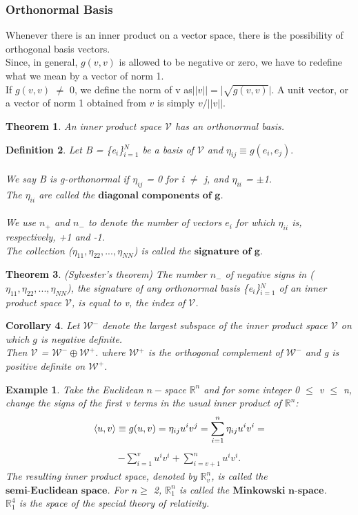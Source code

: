 \documentclass[12pt,a4paper]{article}
\newtheorem{thm}{Theorem}
\newtheorem{cor}[thm]{Corollary}
\newtheorem{defn}[thm]{Definition}
\newtheorem{exmp}{Example}[section]
\begin{document}
\subsubsection{Orthonormal Basis}
Whenever there is an inner product on a vector space, there is the possibility
of orthogonal basis vectors. \\Since, in general, $g(v, v)$ is allowed to be negative or zero, we have to redefine what we mean by a vector of norm 1. \\If
$g(v, v)$ $\ne$ 0, we define the norm of v as$ ||v|| = $|$\sqrt{g(v,v)}|$. A unit vector, or
a vector of norm 1 obtained from $v$ is simply $v /||v||.$
\begin{thm}
An inner product space $\mathcal{V}$ has an orthonormal basis.
\end{thm}
\begin{defn}
Let B = \{e$_i$\}$^N_{i=1}$ be a basis of $\mathcal{V}$ and $\eta_{ij} \equiv g(e_i, e_j).$ \\\\
We say B is g-orthonormal if $\eta_{ij}$ = 0 for i $\ne$ j, and $\eta_{ii}$ = $\pm$1. \\The $\eta_{ii}$ are called the $\textbf{diagonal components of g}$.\\\\
We use $n_+$ and $n_-$ to denote
the number of vectors $e_i$ for which $\eta_{ii}$ is, respectively, +1 and -1.\\ The collection ($\eta_{11}, \eta_{22},..., \eta_{NN}$) is called the $\textbf{signature of g}.$
\end{defn}
\begin{thm}
(Sylvester's theorem)
The number $n_-$ of negative signs in ($\eta_{11}, \eta_{22},..., \eta_{NN}$), the signature of any orthonormal basis \{e$_i$\}$^N_{i=1}$ of an inner product space $\mathcal{V}$, is equal to v, the index of $\mathcal{V}$.
\end{thm}
\begin{cor}
Let $\mathcal{W}$$^-$ denote the largest subspace of the inner product
space $\mathcal{V}$ on which $g$ is negative definite. \\Then $\mathcal{V}$ = $\mathcal{W}^- \oplus \mathcal{W}^+$. where $\mathcal{W}$$^+$ is
the orthogonal complement of $\mathcal{W}^-$ and g is positive definite on $\mathcal{W}^+$.
\end{cor}
\begin{exmp}
Take the Euclidean $n-$space $\mathbb{R}^n$ and for some integer 0 $\leq$ v $\leq$ n, change
the signs of the first v terms in the usual inner product of $\mathbb{R}^n$:
\begin{align*}
\braket{u, v} \equiv g(u,v) = \eta_{ij} u^i v^j = \sum^n_{i=1} \eta_{ij} u^i v^i=
\end{align*}
\begin{align*}
-\sum^v_{i=1} u^i v^i + \sum^n_{i=v+1} u^i v^i. 
\end{align*} 
The resulting inner product space, denoted by $\mathbb{R}^n_v$, is called the $\textbf{semi-Euclidean space}$. For $n \geq$ 2, $\mathbb{R}^n_1$ is called the $\textbf{Minkowski n-space}$.\\$\mathbb{R}^4_1$ is the space of the special theory of relativity.
\end{exmp}
\end{document}

